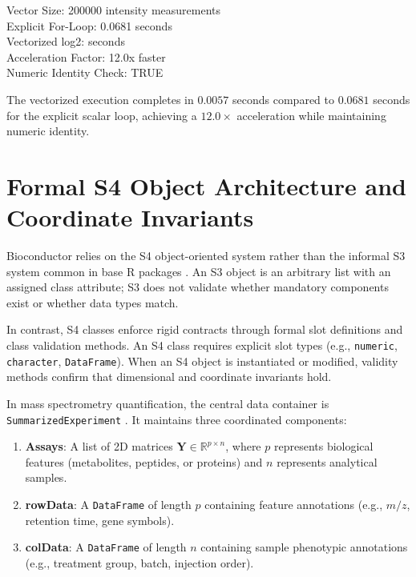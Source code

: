 \documentclass[11pt,twoside,openright]{book}
\begin{document}
\begin{routput}
Vector Size: 200000 intensity measurements\\
\enspace\enspace Explicit For-Loop: 0.0681 seconds\\
\enspace\enspace Vectorized log2:\enspace\enspace{} seconds\\
\enspace\enspace Acceleration Factor: 12.0x faster\\
\enspace\enspace Numeric Identity Check: TRUE
\end{routput}

The vectorized execution completes in $0.0057$ seconds compared to $0.0681$ seconds for the explicit scalar loop, achieving a $12.0\times$ acceleration while maintaining numeric identity.

\FloatBarrier
\section{Formal S4 Object Architecture and Coordinate Invariants}
\label{sec:s4_architecture}

Bioconductor relies on the S4 object-oriented system rather than the informal S3 system common in base R packages \cite{gentleman2004bioconductor, chambers2008software}. An S3 object is an arbitrary list with an assigned class attribute; S3 does not validate whether mandatory components exist or whether data types match.

In contrast, S4 classes enforce rigid contracts through formal slot definitions and class validation methods. An S4 class requires explicit slot types (e.g., \texttt{numeric}, \texttt{character}, \texttt{DataFrame}). When an S4 object is instantiated or modified, validity methods confirm that dimensional and coordinate invariants hold.

In mass spectrometry quantification, the central data container is \texttt{SummarizedExperiment} \cite{huber2015orchestrating}. It maintains three coordinated components:
\begin{enumerate}
\item \textbf{Assays}: A list of 2D matrices $\mathbf{Y} \in \mathbb{R}^{p \times n}$, where $p$ represents biological features (metabolites, peptides, or proteins) and $n$ represents analytical samples.
\item \textbf{rowData}: A \texttt{DataFrame} of length $p$ containing feature annotations (e.g., $m/z$, retention time, gene symbols).
\item \textbf{colData}: A \texttt{DataFrame} of length $n$ containing sample phenotypic annotations (e.g., treatment group, batch, injection order).
\end{enumerate}
\end{document}
